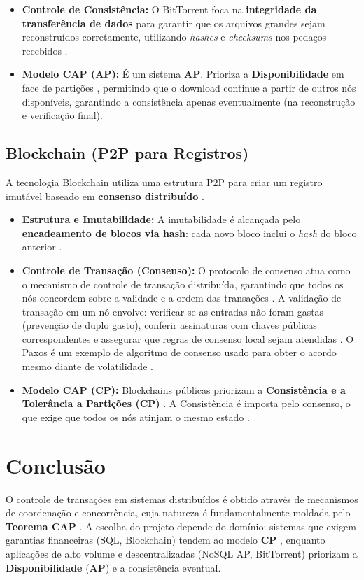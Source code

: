 \documentclass[a4paper,12pt]{article}
\begin{document}
\begin{itemize}
    \item \textbf{Controle de Consistência:} O BitTorrent foca na \textbf{integridade da transferência de dados} para garantir que os arquivos grandes sejam reconstruídos corretamente, utilizando \textit{hashes} e \textit{checksums} nos pedaços recebidos \cite{39, 17}.
    \item \textbf{Modelo CAP (AP):} É um sistema \textbf{AP}. Prioriza a \textbf{Disponibilidade} em face de partições \cite{4}, permitindo que o download continue a partir de outros nós disponíveis, garantindo a consistência apenas eventualmente (na reconstrução e verificação final).
\end{itemize}

\subsection{Blockchain (P2P para Registros)}
A tecnologia Blockchain utiliza uma estrutura P2P \cite{2} para criar um registro imutável baseado em \textbf{consenso distribuído} \cite{25, 30}.

\begin{itemize}
    \item \textbf{Estrutura e Imutabilidade:} A imutabilidade é alcançada pelo \textbf{encadeamento de blocos via hash}: cada novo bloco inclui o \textit{hash} do bloco anterior \cite{22}.
    \item \textbf{Controle de Transação (Consenso):} O protocolo de consenso atua como o mecanismo de controle de transação distribuída, garantindo que todos os nós concordem sobre a validade e a ordem das transações \cite{27}.
    A validação de transação em um nó envolve: verificar se as entradas não foram gastas (prevenção de duplo gasto), conferir assinaturas com chaves públicas correspondentes e assegurar que regras de consenso local sejam atendidas \cite{1}.
    O Paxos é um exemplo de algoritmo de consenso usado para obter o acordo mesmo diante de volatilidade \cite{535, 536}.
    \item \textbf{Modelo CAP (CP):} Blockchains públicas priorizam a \textbf{Consistência e a Tolerância a Partições (CP)} \cite{47, 39}.
    A Consistência é imposta pelo consenso, o que exige que todos os nós atinjam o mesmo estado \cite{38}.
\end{itemize}

\section{Conclusão}
O controle de transações em sistemas distribuídos é obtido através de mecanismos de coordenação e concorrência, cuja natureza é fundamentalmente moldada pelo \textbf{Teorema CAP} \cite{61}.
A escolha do projeto depende do domínio: sistemas que exigem garantias financeiras (SQL, Blockchain) tendem ao modelo \textbf{CP} \cite{67, 425}, enquanto aplicações de alto volume e descentralizadas (NoSQL AP, BitTorrent) priorizam a \textbf{Disponibilidade} (\textbf{AP}) e a consistência eventual.
\end{document}
